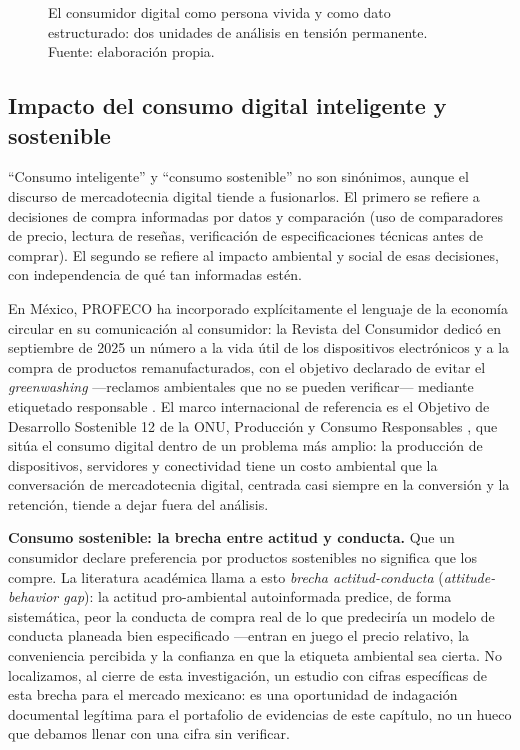 \begin{figure}[htbp]
  \centering
  
  \caption{El consumidor digital como persona vivida y como dato
  estructurado: dos unidades de análisis en tensión permanente. Fuente:
  elaboración propia.}
  \label{fig:cap01-doble-naturaleza}
\end{figure}

\subsection{Impacto del consumo digital inteligente y sostenible}

\enquote{Consumo inteligente} y \enquote{consumo sostenible} no son sinónimos, aunque el
discurso de mercadotecnia digital tiende a fusionarlos. El primero se refiere
a decisiones de compra informadas por datos y comparación (uso de
comparadores de precio, lectura de reseñas, verificación de especificaciones
técnicas antes de comprar). El segundo se refiere al impacto ambiental y
social de esas decisiones, con independencia de qué tan informadas estén.

En México, PROFECO ha incorporado explícitamente el lenguaje de la economía
circular en su comunicación al consumidor: la Revista del Consumidor dedicó
en septiembre de 2025 un número a la vida útil de los dispositivos
electrónicos y a la compra de productos remanufacturados, con el objetivo
declarado de evitar el \textit{greenwashing} —reclamos ambientales que no se
pueden verificar— mediante etiquetado responsable
\parencite{profeco2025entornodigital}. El marco internacional de referencia
es el Objetivo de Desarrollo Sostenible 12 de la ONU, Producción y Consumo
Responsables \parencite{onu2015ods12}, que sitúa el consumo digital dentro de
un problema más amplio: la producción de dispositivos, servidores y
conectividad tiene un costo ambiental que la conversación de mercadotecnia
digital, centrada casi siempre en la conversión y la retención, tiende a dejar
fuera del análisis.

\begin{cajaFrontera}
\textbf{Consumo sostenible: la brecha entre actitud y conducta.}
Que un consumidor declare preferencia por productos sostenibles no significa
que los compre. La literatura académica llama a esto \textit{brecha
actitud-conducta} (\textit{attitude-behavior gap}): la actitud pro-ambiental
autoinformada predice, de forma sistemática, peor la conducta de compra real
de lo que predeciría un modelo de conducta planeada bien especificado —entran
en juego el precio relativo, la conveniencia percibida y la confianza en que
la etiqueta ambiental sea cierta. No localizamos, al cierre de esta
investigación, un estudio con cifras específicas de esta brecha para el
mercado mexicano: es una oportunidad de indagación documental legítima para
el portafolio de evidencias de este capítulo, no un hueco que debamos llenar
con una cifra sin verificar.
\end{cajaFrontera}

